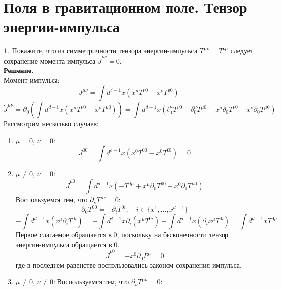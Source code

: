 \documentclass[12pt]{article}
\theoremstyle{definition}
\newtheorem{zad}{}[section]
\begin{document}
\section{Поля в гравитационном поле. Тензор энергии-импульса}
\begin{zad}
Покажите, что из симметричности тензора энергии-импульса $T^{\mu\nu}=T^{\nu\mu}$ следует сохранение момента импульса $\dot{J}^{\mu\nu}=0$.\\
\textbf{Решение.}\\
Момент импульса:
\begin{equation}
    J^{\mu\nu}=\int d^{d-1}x(x^\mu T^{\nu0}-x^\nu T^{\mu0})
\end{equation}
\begin{equation}
    \dot{J}^{\mu\nu}=\partial_0\left(\int d^{d-1}x(x^\mu T^{\nu0}-x^\nu T^{\mu0})\right)=\int d^{d-1}x(\delta^\mu_0 T^{\nu0}-\delta^\nu_0 T^{\mu0}+x^\mu \partial_0T^{\nu0}-x^\nu \partial_0T^{\mu0})
\end{equation}
Рассмотрим несколько случаев:
\begin{enumerate}
    \item $\mu=0$, $\nu=0$:
    \begin{equation}
        J^{00}=\int d^{d-1}x(x^0 T^{00}-x^0 T^{00})=0
    \end{equation}
    \item $\mu\neq0$, $\nu=0$:
    \begin{equation}
        \dot{J}^{\mu0}=\int d^{d-1}x(-T^{0\mu}+x^\mu \partial_0T^{00}-x^0 \partial_0T^{\mu0})
    \end{equation}
    Воспользуемся тем, что $\partial_\nu T^{\mu\nu}=0$:
    \begin{equation}
        \partial_0T^{00}=-\partial_i T^{0i},\quad i\in\{x^1,...,x^{d-1}\}
    \end{equation}
    \begin{equation}
        -\int d^{d-1}x(x^\mu \partial_iT^{0i})=-\int d^{d-1}x\partial_i(x^\mu T^{0i})+\int d^{d-1}x(\partial_ix^\mu T^{0i})=\int d^{d-1}xT^{0\mu}
    \end{equation}
    Первое слагаемое обращается в 0, поскольку на бесконечности тензор энергии-импульса обращается в 0.
    \begin{equation}
        \dot{J}^{\mu0}=-x^0 \partial_0P^\mu=0
    \end{equation}
    где в последнем равенстве воспользовались законом сохранения импульса.
    \item $\mu\neq0$, $\nu\neq0$:
    Воспользуемся тем, что $\partial_\nu T^{\mu\nu}=0$:

\end{enumerate}
\end{zad}
\end{document}
